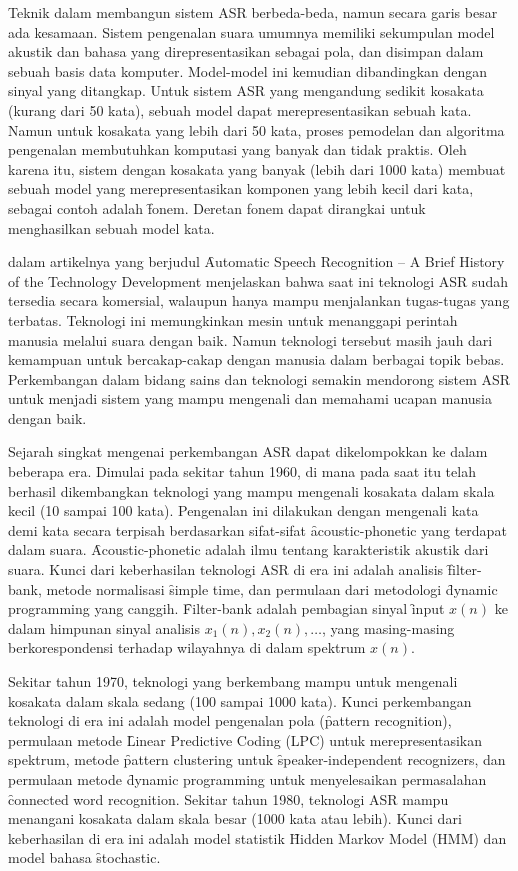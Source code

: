 Teknik dalam membangun sistem ASR berbeda-beda, namun secara garis besar ada kesamaan. Sistem pengenalan suara umumnya memiliki sekumpulan model akustik dan bahasa yang direpresentasikan sebagai pola, dan disimpan dalam sebuah basis data komputer. Model-model ini kemudian dibandingkan dengan sinyal yang ditangkap. Untuk sistem ASR yang mengandung sedikit kosakata (kurang dari 50 kata), sebuah model dapat merepresentasikan sebuah kata. Namun untuk kosakata yang lebih dari 50 kata, proses pemodelan dan algoritma pengenalan membutuhkan komputasi yang banyak dan tidak praktis. Oleh karena itu, sistem dengan kosakata yang banyak (lebih dari 1000 kata) membuat sebuah model yang merepresentasikan komponen yang lebih kecil dari kata, sebagai contoh adalah \f{fonem}. Deretan fonem dapat dirangkai untuk menghasilkan sebuah model kata.

\cite{juang2005automatic} dalam artikelnya yang berjudul \f{Automatic Speech Recognition -- A Brief History of the Technology Development} menjelaskan bahwa saat ini teknologi ASR sudah tersedia secara komersial, walaupun hanya mampu menjalankan tugas-tugas yang terbatas. Teknologi ini memungkinkan mesin untuk menanggapi perintah manusia melalui suara dengan baik. Namun teknologi tersebut masih jauh dari kemampuan untuk bercakap-cakap dengan manusia dalam berbagai topik bebas. Perkembangan dalam bidang sains dan teknologi semakin mendorong sistem ASR untuk menjadi sistem yang mampu mengenali dan memahami ucapan manusia dengan baik.

Sejarah singkat mengenai perkembangan ASR dapat dikelompokkan ke dalam beberapa era. Dimulai pada sekitar tahun 1960, di mana pada saat itu telah berhasil dikembangkan teknologi yang mampu mengenali kosakata dalam skala kecil (10 sampai 100 kata). Pengenalan ini dilakukan dengan mengenali kata demi kata secara terpisah berdasarkan sifat-sifat \f{acoustic-phonetic} yang terdapat dalam suara. \f{Acoustic-phonetic} adalah ilmu tentang karakteristik akustik dari suara. Kunci dari keberhasilan teknologi ASR di era ini adalah analisis \f{filter-bank}, metode normalisasi \f{simple time}, dan permulaan dari metodologi \f{dynamic programming} yang canggih. \f{Filter-bank} adalah pembagian sinyal \f{input} $x(n)$ ke dalam himpunan sinyal analisis  $x_1(n), x_2(n), \ldots$, yang masing-masing berkorespondensi terhadap wilayahnya di dalam spektrum $x(n)$.

Sekitar tahun 1970, teknologi yang berkembang mampu untuk mengenali kosakata dalam skala sedang (100 sampai 1000 kata). Kunci perkembangan teknologi di era ini adalah model pengenalan pola (\f{pattern recognition}), permulaan metode \f{Linear Predictive Coding} (LPC) untuk merepresentasikan spektrum, metode \f{pattern clustering} untuk \f{speaker-independent recognizers}, dan permulaan metode \f{dynamic programming} untuk menyelesaikan permasalahan \f{connected word recognition}. Sekitar tahun 1980, teknologi ASR mampu menangani kosakata dalam skala besar (1000 kata atau lebih). Kunci dari keberhasilan di era ini adalah model statistik \f{Hidden Markov Model} (HMM) dan model bahasa \f{stochastic}.

